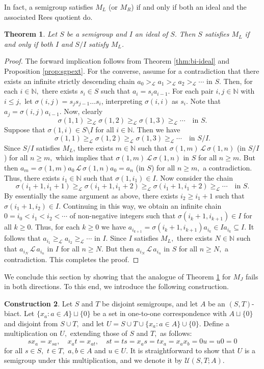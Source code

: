\documentclass[twoside,a4paper,12pt,reqno]{amsart}
\theoremstyle{plain}
\newtheorem{thm}{Theorem}[section]
\theoremstyle{definition}
\newtheorem{con}[thm]{Construction}
\renewcommand{\l}{\mbox{${\mathcal{L}}$}}
\newcommand{\geql}{\geq_{\mathcal{L}}}
\newcommand{\gl}{>_{\mathcal{L}}}
\newcommand{\s}{\sigma}
\newcommand{\N}{\mathbb{N}}
\newcommand{\U}{\mathcal{U}}
\newcommand{\sm}{\setminus}
\begin{document}
In fact, a semigroup satisfies $M_L$ (or $M_R$) if and only if both an ideal and the associated Rees quotient do.

\begin{thm}\label{thm:sgpext}
Let $S$ be a semigroup and $I$ an ideal of $S.$  Then $S$ satisfies $M_L$ if and only if both $I$ and $S/I$ satisfy $M_L$.
\end{thm}

\begin{proof}
The forward implication follows from Theorem \ref{thm:bi-ideal} and Proposition \ref{prop:sgpext}.  For the converse, assume for a contradiction that there exists an infinite strictly descending chain $a_0\gl a_1\gl a_2\gl\cdots$ in $S.$  Then, for each $i\in\N,$ there exists $s_i\in S$ such that $a_i=s_ia_{i-1}$.  For each pair $i,j\in\N$ with $i\leq j,$ let $\s(i,j)=s_js_{j-1}\dots s_i$, interpreting $\s(i,i)$ as $s_i$.  Note that $a_j=\s(i,j)a_{i-1}$.  Now, clearly 
$$\s(1,1)\geql\s(1,2)\geql\s(1,3)\geql\cdots\quad\text{in }S.$$ 
Suppose that $\s(1,i)\in S{\sm}I$ for all $i\in\N.$  Then we have 
$$\s(1,1)\geql\s(1,2)\geql\s(1,3)\geql\cdots\quad\text{in }S/I.$$ 
Since $S/I$ satisfies $M_L$, there exists $m\in\N$ such that $\s(1,m)\,\l\,\s(1,n)$ (in $S/I$) for all $n\geq m,$ which implies that $\s(1,m)\,\l\,\s(1,n)$ in $S$ for all $n\geq m.$  But then $a_m=\s(1,m)a_0\,\l\,\s(1,n)a_0=a_n$ (in $S$) for all $n\geq m,$ a contradiction.  Thus, there exists $i_1\in\N$ such that $\s(1,i_1)\in I.$  Now consider the chain 
$$\s(i_1+1,i_1+1)\geql\s(i_1+1,i_1+2)\geql\s(i_1+1,i_1+2)\geql\cdots\quad\text{in }S.$$ 
By essentially the same argument as above, there exists $i_2\geq i_1+1$ such that $\s(i_1+1,i_2)\in I.$  Continuing in this way, we obtain an infinite chain $0=i_0<i_1<i_2<\cdots$ of non-negative integers such that $\s(i_k+1,i_{k+1})\in I$ for all $k\geq 0.$  Thus, for each $k\geq0$ we have $a_{i_{k+1}}=\s(i_k+1,i_{k+1})a_{i_k}\in Ia_{i_k}\subseteq I.$  It follows that $a_{i_1}\geql a_{i_2}\geql\cdots$ in $I.$  Since $I$ satisfies $M_L,$ there exists $N\in\N$ such that $a_{i_N}\,\l\,a_{i_n}$ in $I$ for all $n\geq N.$  But then $a_{i_N}\,\l\,a_{i_n}$ in $S$ for all $n\geq N,$ a contradiction.  This completes the proof.
\end{proof}

We conclude this section by showing that the analogue of Theorem \ref{thm:sgpext} for $M_J$ fails in both directions.  To this end, we introduce the following construction.

\begin{con}\label{con:S,T;A}
Let $S$ and $T$ be disjoint semigroups, and let $A$ be an $(S,T)$-biact.  Let $\{x_a : a\in A\}\sqcup\{0\}$ be a set in one-to-one correspondence with $A\sqcup\{0\}$ and disjoint from $S\cup T,$ and let $U=S\cup T\cup\{x_a : a\in A\}\cup\{0\}.$  Define a multiplication on $U,$ extending those of $S$ and $T,$ as follows:
$$sx_a=x_{sa},\quad x_at=x_{at},\quad st=ts=x_as=tx_a=x_ax_b=0u=u0=0$$
for all $s\in S,$ $t\in T,$ $a,b\in A$ and $u\in U.$  It is straightforward to show that $U$ is a semigroup under this multiplication, and we denote it by $\U(S,T;A).$ 
\end{con}
\end{document}
